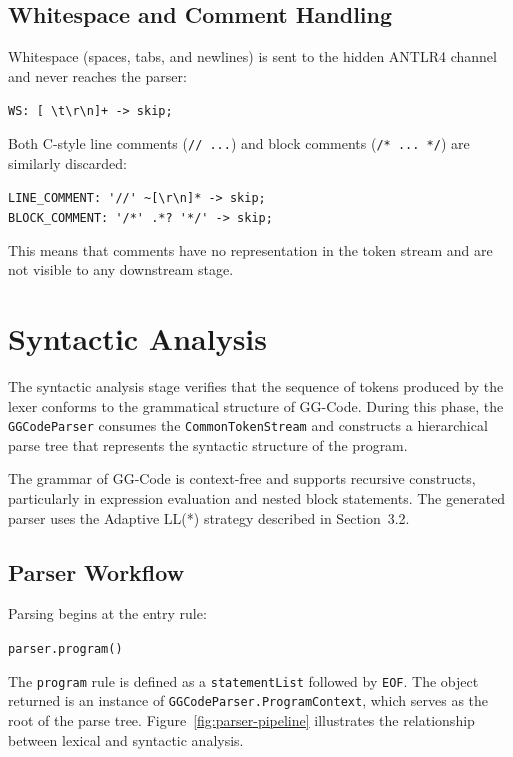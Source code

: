 \subsection*{Whitespace and Comment Handling}

Whitespace (spaces, tabs, and newlines) is sent to the hidden ANTLR4 channel and never reaches the parser:

\begin{center}
\verb|WS: [ \t\r\n]+ -> skip;|
\end{center}

Both C-style line comments (\verb|// ...|) and block comments (\verb|/* ... */|) are similarly discarded:

\begin{center}
\verb|LINE_COMMENT: '//' ~[\r\n]* -> skip;| \\
\verb|BLOCK_COMMENT: '/*' .*? '*/' -> skip;|
\end{center}

This means that comments have no representation in the token stream and are not visible to any downstream stage.

\section{Syntactic Analysis}

The syntactic analysis stage verifies that the sequence of tokens produced by the lexer conforms to the grammatical structure of GG-Code. During this phase, the \texttt{GGCodeParser} consumes the \texttt{CommonTokenStream} and constructs a hierarchical parse tree that represents the syntactic structure of the program.

The grammar of GG-Code is context-free and supports recursive constructs, particularly in expression evaluation and nested block statements. The generated parser uses the Adaptive LL(*) strategy described in Section~3.2.

\subsection*{Parser Workflow}

Parsing begins at the entry rule:

\begin{center}
\verb|parser.program()|
\end{center}

The \texttt{program} rule is defined as a \texttt{statementList} followed by \texttt{EOF}. The object returned is an instance of \texttt{GGCodeParser.ProgramContext}, which serves as the root of the parse tree. Figure~\ref{fig:parser-pipeline} illustrates the relationship between lexical and syntactic analysis.


